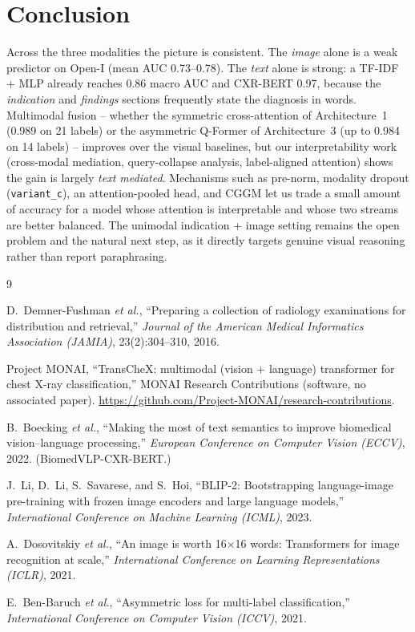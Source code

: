 \documentclass[11pt]{article}
\begin{document}
\section{Conclusion}

Across the three modalities the picture is consistent. The \emph{image} alone is a
weak predictor on Open-I (mean AUC 0.73--0.78). The \emph{text} alone is strong: a
TF-IDF + MLP already reaches 0.86 macro AUC and CXR-BERT 0.97, because the
\emph{indication} and \emph{findings} sections frequently state the diagnosis in
words. Multimodal fusion -- whether the symmetric cross-attention of Architecture~1
(0.989 on 21 labels) or the asymmetric Q-Former of Architecture~3 (up to 0.984 on 14
labels) -- improves over the visual baselines, but our interpretability work
(cross-modal mediation, query-collapse analysis, label-aligned attention) shows the
gain is largely \emph{text mediated}. Mechanisms such as pre-norm, modality dropout
(\texttt{variant\_c}), an attention-pooled head, and CGGM let us trade a small amount
of accuracy for a model whose attention is interpretable and whose two streams are
better balanced. The unimodal indication + image setting remains the open problem and
the natural next step, as it directly targets genuine visual reasoning rather than
report paraphrasing.

\begin{thebibliography}{9}

D.~Demner-Fushman \emph{et al.},
``Preparing a collection of radiology examinations for distribution and retrieval,''
\emph{Journal of the American Medical Informatics Association (JAMIA)}, 23(2):304--310, 2016.

Project MONAI, ``TransCheX: multimodal (vision + language) transformer for chest X-ray
classification,'' MONAI Research Contributions (software, no associated paper).
\url{https://github.com/Project-MONAI/research-contributions}.

B.~Boecking \emph{et al.},
``Making the most of text semantics to improve biomedical vision--language processing,''
\emph{European Conference on Computer Vision (ECCV)}, 2022. (BiomedVLP-CXR-BERT.)

J.~Li, D.~Li, S.~Savarese, and S.~Hoi,
``BLIP-2: Bootstrapping language-image pre-training with frozen image encoders and large
language models,'' \emph{International Conference on Machine Learning (ICML)}, 2023.

A.~Dosovitskiy \emph{et al.},
``An image is worth 16$\times$16 words: Transformers for image recognition at scale,''
\emph{International Conference on Learning Representations (ICLR)}, 2021.

E.~Ben-Baruch \emph{et al.},
``Asymmetric loss for multi-label classification,''
\emph{International Conference on Computer Vision (ICCV)}, 2021.

\end{thebibliography}
\end{document}
